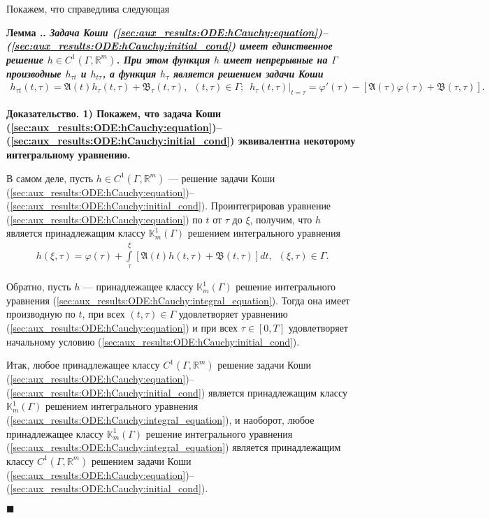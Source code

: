 \documentclass{report}
\newcounter{rem}[section]
\newcounter{lem}[section]
\renewcommand{\thelem}{\thesection.\arabic{lem}}
\newenvironment{Lemma}{\par\refstepcounter{lem}\bf Лемма \thelem. \it}{\rm\par}
\newcounter{theor}[section]
\newenvironment{Proof}{\par\noindent\bf Доказательство.\rm}{ $\blacksquare$\par}
\begin{document}
Покажем, что справедлива следующая
\begin{Lemma}\label{sec:aux_results:ODE:hCauchy:unique_existence_theorem}
Задача Коши (\ref{sec:aux_results:ODE:hCauchy:equation})--(\ref{sec:aux_results:ODE:hCauchy:initial_cond}) имеет единственное решение $h\in C^1(\Gamma,\mathbb{R}^m)$. При этом функция $h$
имеет непрерывные на $\Gamma$ производные $h_{\tau t}$ и $h_{t\tau}$, а функция $h_\tau$ является решением задачи Коши
\begin{gather}\label{sec:aux_results:ODE:h_tau_Cauchy}
h_{\tau t}(t,\tau)=\mathfrak{A}(t)h_\tau(t,\tau)+\mathfrak{B}_\tau(t,\tau),\,\,\,(t,\tau)\in\Gamma;\,\,\,
h_{\tau}(t,\tau)|_{t=\tau}=\varphi'(\tau)-[\mathfrak{A}(\tau)\varphi(\tau)+\mathfrak{B}(\tau,\tau)].
\end{gather}
\end{Lemma}
\begin{Proof}
1) Покажем, что задача Коши (\ref{sec:aux_results:ODE:hCauchy:equation})--(\ref{sec:aux_results:ODE:hCauchy:initial_cond}) эквивалентна некоторому интегральному уравнению.

В самом деле, пусть $h\in C^1(\Gamma,\mathbb{R}^m)$ --- решение задачи Коши (\ref{sec:aux_results:ODE:hCauchy:equation})--(\ref{sec:aux_results:ODE:hCauchy:initial_cond}). Проинтегрировав
уравнение (\ref{sec:aux_results:ODE:hCauchy:equation}) по $t$ от $\tau$ до $\xi$, получим, что $h$ является принадлежащим классу $\mathbb{K}^1_m(\Gamma)$ решением интегрального уравнения
\begin{gather}\label{sec:aux_results:ODE:hCauchy:integral_equation}
h(\xi,\tau)=\varphi(\tau)+\int\limits_\tau^\xi[\mathfrak{A}(t)h(t,\tau)+\mathfrak{B}(t,\tau)]dt,\,\,\,(\xi,\tau)\in\Gamma.
\end{gather}

Обратно, пусть $h$ --- принадлежащее классу $\mathbb{K}^1_m(\Gamma)$ решение интегрального уравнения (\ref{sec:aux_results:ODE:hCauchy:integral_equation}). Тогда она имеет производную по
$t$, при всех $(t,\tau)\in\Gamma$ удовлетворяет уравнению (\ref{sec:aux_results:ODE:hCauchy:equation}) и при всех $\tau\in[0,T]$ удовлетворяет начальному условию
(\ref{sec:aux_results:ODE:hCauchy:initial_cond}).

Итак, любое принадлежащее классу $C^1(\Gamma,\mathbb{R}^m)$ решение задачи Коши (\ref{sec:aux_results:ODE:hCauchy:equation})--(\ref{sec:aux_results:ODE:hCauchy:initial_cond}) является
принадлежащим классу $\mathbb{K}^1_m(\Gamma)$ решением интегрального уравнения (\ref{sec:aux_results:ODE:hCauchy:integral_equation}), и наоборот, любое принадлежащее классу
$\mathbb{K}^1_m(\Gamma)$ решение интегрального уравнения (\ref{sec:aux_results:ODE:hCauchy:integral_equation}) является принадлежащим классу  $C^1(\Gamma,\mathbb{R}^m)$ решением задачи
Коши (\ref{sec:aux_results:ODE:hCauchy:equation})--(\ref{sec:aux_results:ODE:hCauchy:initial_cond}).


\end{Proof}
\end{document}
